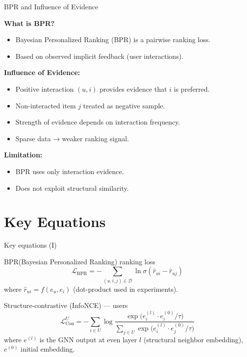 \documentclass{beamer}
\begin{document}
\begin{frame}{BPR and Influence of Evidence}
\small

\textbf{What is BPR?}

\begin{itemize}
    \item Bayesian Personalized Ranking (BPR) is a pairwise ranking loss.
    \item Based on observed implicit feedback (user interactions).
\end{itemize}

\textbf{Influence of Evidence:}

\begin{itemize}
    \item Positive interaction $(u,i)$ provides evidence that $i$ is preferred.
    \item Non-interacted item $j$ treated as negative sample.
    \item Strength of evidence depends on interaction frequency.
    \item Sparse data → weaker ranking signal.
\end{itemize}

\textbf{Limitation:}
\begin{itemize}
    \item BPR uses only interaction evidence.
    \item Does not exploit structural similarity.
\end{itemize}

\end{frame}



\section{Key Equations}
\begin{frame}{Key equations (I)}
\small
  \begin{block}{BPR(Bayesian Personalized Ranking) ranking loss}
    \[
      \mathcal{L}_{\text{BPR}} = - \sum_{(u,i,j)\in \mathcal{D}} \ln \sigma(\hat r_{ui} - \hat r_{uj})
    \]
    where $\hat r_{ui}=f(e_u,e_i)$ (dot-product used in experiments).
  \end{block}
  \begin{block}{Structure-contrastive (InfoNCE) — users}
    \[
    \mathcal{L}_{\text{Con}}^{U} = -\sum_{i\in U}\log \frac{\exp\big(e_i^{(l)}\cdot e_i^{(0)}/\tau\big)}
    {\sum_{j\in U}\exp\big(e_i^{(l)}\cdot e_j^{(0)}/\tau\big)}
    \]
    where $e^{(l)}$ is the GNN output at even layer $l$ (structural neighbor embedding), $e^{(0)}$ initial embedding.
  \end{block}
\end{frame}
\end{document}
